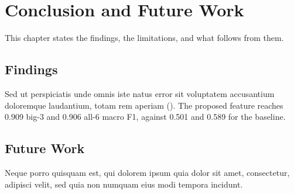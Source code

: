 \chapter{Conclusion and Future Work}
\label{chap:conclusion}

This chapter states the findings, the limitations, and what follows from them.

\section{Findings}
\label{sec:conclusion-findings}

Sed ut perspiciatis unde omnis iste natus error sit voluptatem accusantium doloremque laudantium, totam rem aperiam ().
The proposed feature reaches 0.909 big-3 and 0.906 all-6 macro F1, against 0.501 and 0.589 for the baseline.

\section{Future Work}
\label{sec:conclusion-future}

Neque porro quisquam est, qui dolorem ipsum quia dolor sit amet, consectetur, adipisci velit, sed quia non numquam eius modi tempora incidunt.
